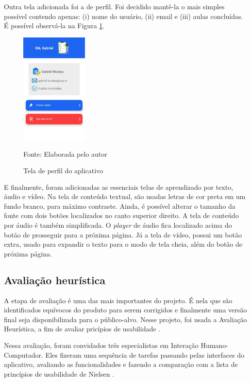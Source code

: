 Outra tela adicionada foi a de perfil. Foi decidido mantê-la o mais simples possível contendo apenas: (i) nome do usuário, (ii) email e (iii) aulas concluídas. É possível observá-la na Figura \ref{fig:perfil}.

\begin{figure}[H]
\centering
    \caption{Tela de perfil do aplicativo}
    \label{fig:perfil}
    \includegraphics[width=0.3\textwidth]{Figuras/profile.jpg}
    
    Fonte: Elaborada pelo autor
\end{figure}

E finalmente, foram adicionadas as essenciais telas de aprendizado por texto, áudio e vídeo.
Na tela de conteúdo textual, são usadas letras de cor preta em um fundo branco, para máximo contraste. Ainda, é possível alterar o tamanho da fonte com dois botões localizados no canto superior direito.
A tela de conteúdo por áudio é também simplificada. O \textit{player} de áudio fica localizado acima do botão de prosseguir para a próxima página.
Já a tela de vídeo, possui um botão extra, usado para expandir o texto para o modo de tela cheia, além do botão de próxima página. 

\subsection{Avaliação heurística}
A etapa de avaliação é uma das mais importantes do projeto. É nela que são identificados equívocos do produto para serem corrigidos e finalmente uma versão final seja disponibilizada para o público-alvo. Nesse projeto, foi usada a Avaliação Heurística, a fim de avaliar pricípios de usabilidade \citep{nielsen1994inspection}.

Nessa avaliação, foram convidados três especialistas em Interação Humano-Computador.
Eles fizeram uma sequência de tarefas passando pelas interfaces do aplicativo, avaliando as funcionalidades e fazendo a comparação com a lista de princípios de usabilidade de Nielsen \citep{nielsen1994usability}.

